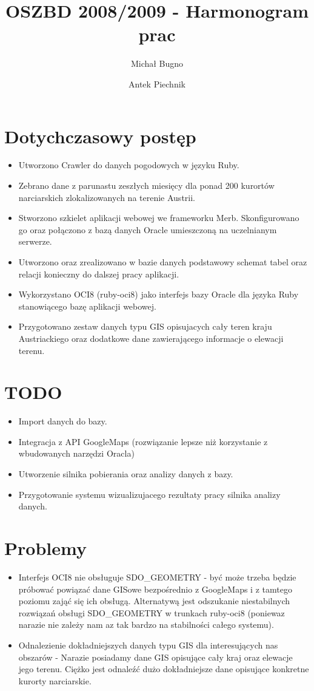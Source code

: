 \documentclass[12pt]{article}
\author{Michał Bugno \and Antek Piechnik}
\title{OSZBD 2008/2009 - Harmonogram prac}
\begin{document}
\maketitle

\section{Dotychczasowy postęp}
\begin{itemize}
\item Utworzono Crawler do danych pogodowych w języku Ruby.
\item Zebrano dane z parunastu zeszłych miesięcy dla ponad 200 kurortów narciarskich zlokalizowanych na terenie Austrii.
\item Stworzono szkielet aplikacji webowej we frameworku Merb. 
Skonfigurowano go oraz połączono z bazą danych Oracle umieszczoną na uczelnianym serwerze.
\item Utworzono oraz zrealizowano w bazie danych podstawowy schemat tabel oraz relacji konieczny do dalszej pracy aplikacji.
\item Wykorzystano OCI8 (ruby-oci8) jako interfejs bazy Oracle dla języka Ruby stanowiącego bazę aplikacji webowej.
\item Przygotowano zestaw danych typu GIS opisujacych cały teren kraju Austriackiego oraz dodatkowe dane zawierającego informacje o elewacji terenu.
\end{itemize}

\section{TODO}
\begin{itemize}
\item Import danych do bazy.
\item Integracja z API GoogleMaps (rozwiązanie lepsze niż korzystanie z wbudowanych narzędzi Oracla)
\item Utworzenie silnika pobierania oraz analizy danych z bazy.
\item Przygotowanie systemu wizualizujacego rezultaty pracy silnika analizy danych.
\end{itemize}

\section{Problemy}
\begin{itemize}
\item Interfejs OCI8 nie obsługuje SDO\_GEOMETRY - 
być może trzeba będzie próbować powiązać dane GISowe bezpośrednio z GoogleMaps i z tamtego poziomu zająć się ich obsługą.
Alternatywą jest odszukanie niestabilnych rozwiązań obsługi SDO\_GEOMETRY w trunkach ruby-oci8 (poniewaz narazie nie zależy nam az tak bardzo na stabilności całego systemu).
\item Odnalezienie dokładniejszych danych typu GIS dla interesujących nas obszarów - 
Narazie posiadamy dane GIS opisujące cały kraj oraz elewacje jego terenu. Ciężko jest odnaleźć dużo dokładniejsze dane opisujące konkretne kurorty narciarskie.
\end{itemize}
\end{document}
